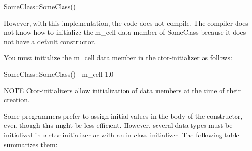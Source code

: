 \begin{cpp}
SomeClass::SomeClass() { }
\end{cpp}

However, with this implementation, the code does not compile. The compiler does not know how to initialize the m\_cell data member of SomeClass because it does not have a default constructor.

You must initialize the m\_cell data member in the ctor-initializer as follows:

\begin{cpp}
SomeClass::SomeClass() : m_cell { 1.0 } { }
\end{cpp}

\begin{myNotic}{NOTE}
Ctor-initializers allow initialization of data members at the time of their creation.
\end{myNotic}

Some programmers prefer to assign initial values in the body of the constructor, even though this might be less efficient. However, several data types must be initialized in a ctor-initializer or with an in-class initializer. The following table summarizes them:

